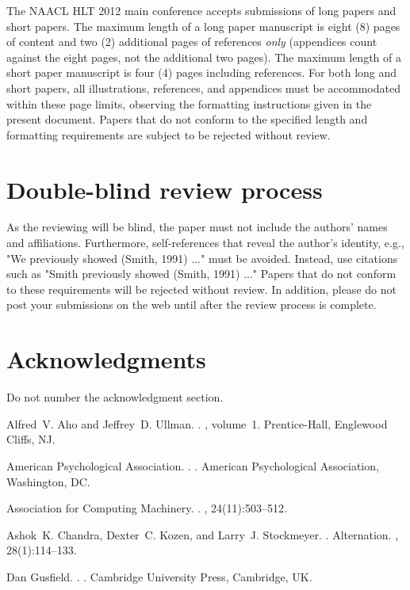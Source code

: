 \documentclass[11pt,letterpaper]{article}
\begin{document}
The NAACL HLT 2012 main conference accepts submissions of long papers
and short papers.  The maximum length of a long paper manuscript is
eight (8) pages of content and two (2) additional pages of references
\emph{only} (appendices count against the eight pages, not the
additional two pages).  The maximum length of a short paper manuscript
is four (4) pages including references.  For both long and short
papers, all illustrations, references, and appendices must be
accommodated within these page limits, observing the formatting
instructions given in the present document.  Papers that do not
conform to the specified length and formatting requirements are
subject to be rejected without review.

\section{Double-blind review process}
\label{sec:blind}

As the reviewing will be blind, the paper must not include the authors' names and affiliations. Furthermore, self-references that reveal the author's identity, e.g., "We previously showed (Smith, 1991) ..." must be avoided. Instead, use citations such as "Smith previously showed (Smith, 1991) ..." Papers that do not conform to these requirements will be rejected without review. In addition, please do not post your submissions on the web until after the review process is complete.

\section*{Acknowledgments}

Do not number the acknowledgment section.

\begin{thebibliography}{}

Alfred~V. Aho and Jeffrey~D. Ullman.
.
, volume~1.
\newblock Prentice-{Hall}, Englewood Cliffs, NJ.

{American Psychological Association}.
.
.
\newblock American Psychological Association, Washington, DC.

{Association for Computing Machinery}.
.
, 24(11):503--512.

Ashok~K. Chandra, Dexter~C. Kozen, and Larry~J. Stockmeyer.
.
\newblock Alternation.
,
  28(1):114--133.

Dan Gusfield.
.
.
\newblock Cambridge University Press, Cambridge, UK.

\end{thebibliography}
\end{document}
